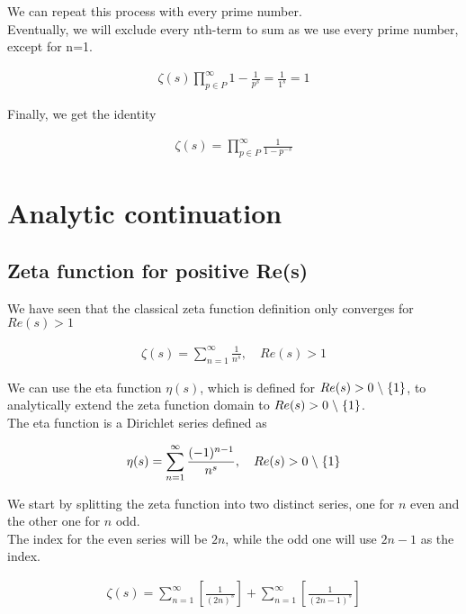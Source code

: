\documentclass{article}
\newcommand{\exceptone}{
    \hspace{0.1cm}\backslash\hspace{0.1cm}\{ 1\}
}
\begin{document}
We can repeat this process with every prime number.
\\
Eventually, we will exclude every nth-term to sum as we use every prime number, except for n=1.

\begin{align*}
    \zeta(s)\prod_{p\in P}^{\infty}1-\frac{1}{p^s}=\frac{1}{1^s}=1
\end{align*}

Finally, we get the identity

\begin{align*}
    \zeta(s)=
    \prod_{p\in P}^{\infty}\frac{1}{1-p^{-s}}
\end{align*}

\pagebreak

\section{Analytic continuation}

\subsection{Zeta function for positive Re(s)}

We have seen that the classical zeta function definition only converges for $Re(s)>1$

\begin{align*}
    \zeta(s)=\sum_{n=1}^{\infty}\frac{1}{n^s},
    \quad Re(s)>1
\end{align*}

We can use the eta function $\eta(s)$, which is defined for $Re(s)>0\exceptone$, to analytically extend the zeta function domain to $Re(s)>0\exceptone$.
\\
The eta function is a Dirichlet series defined as

\begin{align*}
    \eta(s)=\sum_{n=1}^{\infty}\frac{(-1)^{n-1}}{n^s},
    \quad Re(s)>0\exceptone
\end{align*}

We start by splitting the zeta function into two distinct series, one for $n$ even and the other one for $n$ odd.
\\
The index for the even series will be $2n$, while the odd one will use $2n-1$ as the index.

\begin{align*}
    \zeta(s)=
    \sum_{n=1}^{\infty}\left[\frac{1}{(2n)^s}\right]+
    \sum_{n=1}^{\infty}\left[\frac{1}{(2n-1)^s}\right]
\end{align*}
\end{document}
